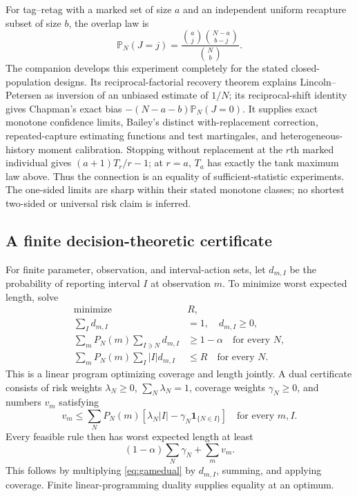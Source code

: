 \documentclass[11pt]{article}
\numberwithin{equation}{section}
\theoremstyle{definition}
\theoremstyle{remark}
\newcommand{\Pp}{\mathbb P}
\newcommand{\ind}{\mathbf1}
\begin{document}
For tag--retag with a marked set of size $a$ and an independent uniform
recapture subset of size $b$, the overlap law is
\[
 \Pp_N(J=j)=\frac{\binom aj\binom{N-a}{b-j}}{\binom Nb}.
\]
The companion \cite{LongCapture} develops this experiment completely for the
stated closed-population designs. Its reciprocal-factorial recovery theorem
explains Lincoln--Petersen as inversion of an unbiased estimate of $1/N$;
its reciprocal-shift identity gives Chapman's exact bias
$-(N-a-b)\Pp_N(J=0)$. It supplies exact monotone confidence limits,
Bailey's distinct with-replacement correction, repeated-capture estimating
functions and test martingales, and heterogeneous-history moment calibration.
Stopping without replacement at the $r$th marked individual gives
$(a+1)T_r/r-1$; at $r=a$, $T_a$ has exactly the tank maximum law above.
Thus the connection is an equality of sufficient-statistic experiments.
The one-sided limits are sharp within their stated monotone classes; no
shortest two-sided or universal risk claim is inferred.

\subsection{A finite decision-theoretic certificate}
For finite parameter, observation, and interval-action sets, let $d_{m,I}$ be the probability of reporting interval $I$ at observation $m$. To minimize worst expected length, solve
\begin{align}\label{eq:game}
 \text{minimize }&R,\nonumber\\
 \sum_I d_{m,I}&=1,\quad d_{m,I}\ge0,\nonumber\\
 \sum_mP_N(m)\sum_{I\ni N}d_{m,I}&\ge1-\alpha\quad\text{for every }N,\\
 \sum_mP_N(m)\sum_I|I|d_{m,I}&\le R\quad\text{for every }N.\nonumber
\end{align}
This is a linear program optimizing coverage and length jointly. A dual certificate consists of risk weights $\lambda_N\ge0$, $\sum_N\lambda_N=1$, coverage weights $\gamma_N\ge0$, and numbers $v_m$ satisfying
\begin{equation}\label{eq:gamedual}
 v_m\le\sum_NP_N(m)[\lambda_N|I|-\gamma_N\ind_{\{N\in I\}}]
 \quad\text{for every }m,I.
\end{equation}
Every feasible rule then has worst expected length at least
\begin{equation}\label{eq:dualvalue}
 (1-\alpha)\sum_N\gamma_N+\sum_mv_m.
\end{equation}
This follows by multiplying \eqref{eq:gamedual} by $d_{m,I}$, summing, and applying coverage. Finite linear-programming duality supplies equality at an optimum.
\end{document}
